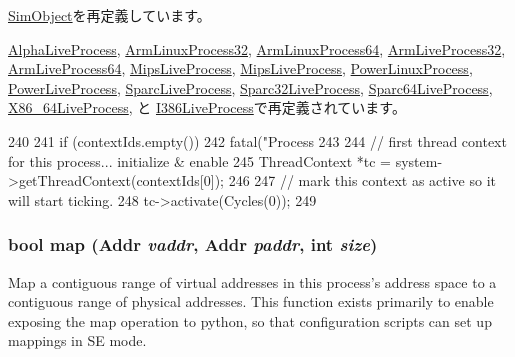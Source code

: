 \hyperlink{classSimObject_a3c34ea9b29f410748d4435a667484924}{SimObject}を再定義しています。

\hyperlink{classAlphaLiveProcess_a3c34ea9b29f410748d4435a667484924}{AlphaLiveProcess}, \hyperlink{classArmLinuxProcess32_a3c34ea9b29f410748d4435a667484924}{ArmLinuxProcess32}, \hyperlink{classArmLinuxProcess64_a3c34ea9b29f410748d4435a667484924}{ArmLinuxProcess64}, \hyperlink{classArmLiveProcess32_a3c34ea9b29f410748d4435a667484924}{ArmLiveProcess32}, \hyperlink{classArmLiveProcess64_a3c34ea9b29f410748d4435a667484924}{ArmLiveProcess64}, \hyperlink{classMipsLiveProcess_a3c34ea9b29f410748d4435a667484924}{MipsLiveProcess}, \hyperlink{classMipsLiveProcess_a3c34ea9b29f410748d4435a667484924}{MipsLiveProcess}, \hyperlink{classPowerLinuxProcess_a3c34ea9b29f410748d4435a667484924}{PowerLinuxProcess}, \hyperlink{classPowerLiveProcess_a3c34ea9b29f410748d4435a667484924}{PowerLiveProcess}, \hyperlink{classSparcLiveProcess_a3c34ea9b29f410748d4435a667484924}{SparcLiveProcess}, \hyperlink{classSparc32LiveProcess_a3c34ea9b29f410748d4435a667484924}{Sparc32LiveProcess}, \hyperlink{classSparc64LiveProcess_a3c34ea9b29f410748d4435a667484924}{Sparc64LiveProcess}, \hyperlink{classX86ISA_1_1X86__64LiveProcess_a3c34ea9b29f410748d4435a667484924}{X86\_\-64LiveProcess}, と \hyperlink{classX86ISA_1_1I386LiveProcess_a3c34ea9b29f410748d4435a667484924}{I386LiveProcess}で再定義されています。


\begin{DoxyCode}
240 {
241     if (contextIds.empty())
242         fatal("Process %
243 
244     // first thread context for this process... initialize & enable
245     ThreadContext *tc = system->getThreadContext(contextIds[0]);
246 
247     // mark this context as active so it will start ticking.
248     tc->activate(Cycles(0));
249 }
\end{DoxyCode}
\hypertarget{classProcess_ac2bb68c3c87d0a046f848f537abb23fc}{
\subsubsection[{map}]{\setlength{\rightskip}{0pt plus 5cm}bool map ({\bf Addr} {\em vaddr}, \/  {\bf Addr} {\em paddr}, \/  int {\em size})}}
\label{classProcess_ac2bb68c3c87d0a046f848f537abb23fc}
Map a contiguous range of virtual addresses in this process's address space to a contiguous range of physical addresses. This function exists primarily to enable exposing the map operation to python, so that configuration scripts can set up mappings in SE mode.


